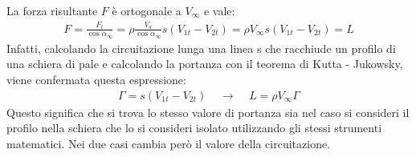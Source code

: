 La forza risultante $F$ è ortogonale a $V_\infty$ e vale:
\begin{align*}
F=\frac{F_t}{\cos \alpha_{\infty}}=\rho \frac{V_a}{\cos \alpha_{\infty}}s(V_{1t}-V_{2t})=\rho V_\infty s (V_{1t}-V_{2t})=L
\end{align*}
Infatti, calcolando la circuitazione lunga una linea s che racchiude un profilo di una schiera di pale e calcolando la portanza con il teorema di Kutta - Jukowsky, viene confermata questa espressione:
\begin{align*}
\Gamma=s(V_{1t}-V_{2t}) \;\;\;\; \rightarrow \;\;\;\; L=\rho V_\infty \Gamma
\end{align*}
Questo significa che si trova lo stesso valore di portanza sia nel caso si consideri il profilo nella schiera che lo si consideri isolato utilizzando gli stessi strumenti matematici. Nei due casi cambia però il valore della circuitazione.

